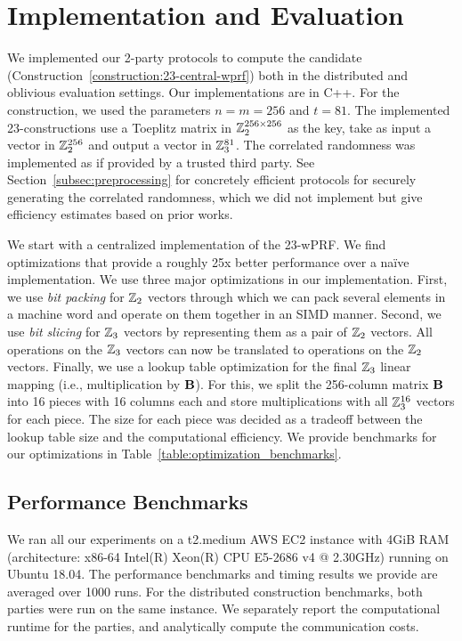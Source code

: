 \section{Implementation and Evaluation}
\label{sec:implementation_and_eval}
We implemented our 2-party protocols to compute the \ttwPRF candidate (Construction~\ref{construction:23-central-wprf}) both in the distributed and oblivious evaluation settings. Our implementations are in C++. For the \ttwPRF construction, we used the parameters $n = m = 256$ and $t = 81$. The implemented 23-constructions use a Toeplitz matrix in $\mathbb{Z}_2^{256 \times 256}$ as the key, take as input a vector in $\mathbb{Z}_2^{256}$ and output a vector in $\mathbb{Z}_3^{81}$. The correlated randomness was implemented as if provided by a trusted third party. See Section~\ref{subsec:preprocessing} for concretely efficient protocols for securely generating the correlated randomness, which we did not implement but give efficiency estimates based on prior works. 


We start with a centralized implementation of the 23-wPRF. We find optimizations that provide a roughly 25x better performance over a na\"ive implementation. We use three major optimizations in our implementation. First, we use \textit{bit packing} for $\mathbb{Z}_2$ vectors through which we can pack several elements in a machine word and operate on them together in an SIMD manner. Second, we use \textit{bit slicing} for $\mathbb{Z}_3$ vectors by representing them as a pair of $\mathbb{Z}_2$ vectors. All operations on the $\mathbb{Z}_3$ vectors can now be translated to operations on the $\mathbb{Z}_2$ vectors. Finally, we use a lookup table optimization for the final $\mathbb{Z}_3$ linear mapping (i.e., multiplication by $\mat{B}$). For this, we split the 256-column matrix $\mat{B}$ into 16 pieces with 16 columns each and store multiplications with all $\mathbb{Z}_3^{16}$ vectors for each piece. The size for each piece was decided as a tradeoff between the lookup table size and the computational efficiency. We provide benchmarks for our optimizations in Table~\ref{table:optimization_benchmarks}.


\subsection{Performance Benchmarks}
\label{subsec:performance}
We ran all our experiments on a t2.medium AWS EC2 instance with 4GiB RAM (architecture: x86-64 Intel(R) Xeon(R) CPU E5-2686 v4 @ 2.30GHz) running on Ubuntu 18.04. The performance benchmarks and timing results we provide are averaged over 1000 runs. For the distributed construction benchmarks, both parties were run on the same instance. We separately report the computational runtime for the parties, and analytically compute the communication costs. 

